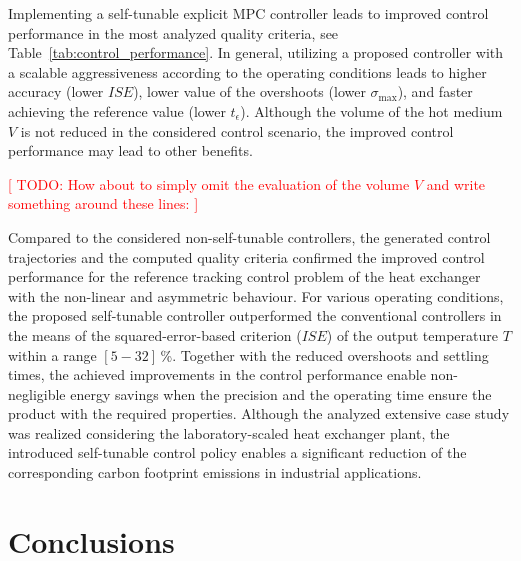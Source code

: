 \documentclass[preprint,12pt]{elsarticle}
\begin{document}
	Implementing a self-tunable explicit MPC controller leads to improved control performance in the most analyzed quality criteria, see Table~\ref{tab:control_performance}. In general, utilizing a proposed controller with a scalable aggressiveness according to the operating conditions leads to higher accuracy (lower $ISE$), lower value of the overshoots (lower $\sigma_{\mathrm{max}}$), and faster achieving the reference value (lower $t_{\epsilon}$). %
	Although the volume of the hot medium $V$ is not reduced in the considered control scenario, the improved control performance may lead to other benefits. 
	
	
	\textcolor{red}{[ TODO: How about to simply omit the evaluation of the volume $V$ and write something around these lines: ]}
	
	Compared to the considered non-self-tunable controllers, the generated control trajectories and the computed quality criteria confirmed the improved control performance for the reference tracking control problem of the heat exchanger with the non-linear and asymmetric behaviour. 
	For various operating conditions, the proposed self-tunable controller outperformed the conventional controllers in the means of the squared-error-based criterion ($ISE$) of the output temperature $T$ within a range $[5-32]$\,\%.  
	Together with the reduced overshoots and settling times, the achieved improvements in the control performance enable non-negligible energy savings when the precision and the operating time ensure the product with the required properties. Although the analyzed extensive case study was realized considering the laboratory-scaled heat exchanger plant, the introduced self-tunable control policy enables a significant reduction of the corresponding carbon footprint emissions in industrial applications. 
	
	\section{Conclusions}
	\label{sec:conclusion}
	
\end{document}
